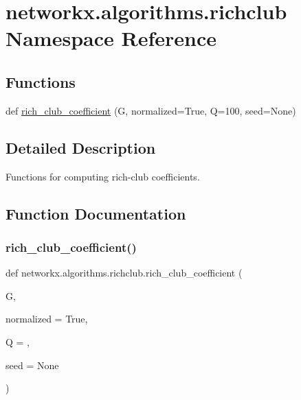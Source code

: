 \hypertarget{namespacenetworkx_1_1algorithms_1_1richclub}{}\section{networkx.\+algorithms.\+richclub Namespace Reference}
\label{namespacenetworkx_1_1algorithms_1_1richclub}
\subsection*{Functions}
\begin{DoxyCompactItemize}
\item 
def \hyperlink{namespacenetworkx_1_1algorithms_1_1richclub_abd300152aa2d832134f08625a81c9706}{rich\+\_\+club\+\_\+coefficient} (G, normalized=True, Q=100, seed=None)
\end{DoxyCompactItemize}


\subsection{Detailed Description}
\begin{DoxyVerb}Functions for computing rich-club coefficients.\end{DoxyVerb}
 

\subsection{Function Documentation}
\mbox{\label{namespacenetworkx_1_1algorithms_1_1richclub_abd300152aa2d832134f08625a81c9706}} 
\subsubsection{\texorpdfstring{rich\+\_\+club\+\_\+coefficient()}{rich\_club\_coefficient()}}
{\footnotesize\ttfamily def networkx.\+algorithms.\+richclub.\+rich\+\_\+club\+\_\+coefficient (\begin{DoxyParamCaption}\item[{}]{G,  }\item[{}]{normalized = {\ttfamily True},  }\item[{}]{Q = {},  }\item[{}]{seed = {\ttfamily None} }\end{DoxyParamCaption})}

